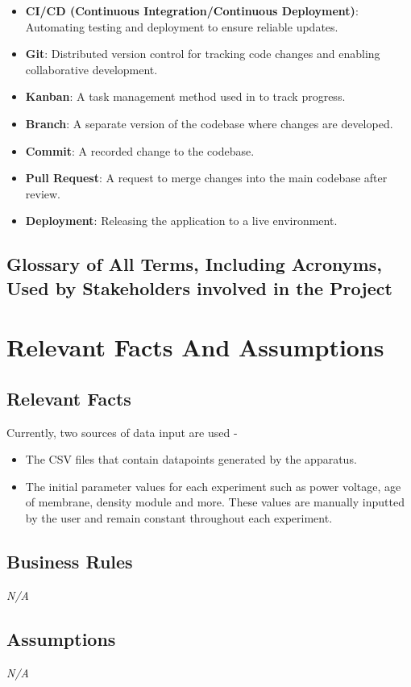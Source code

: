 \documentclass[12pt]{article}
\begin{document}
\begin{itemize}
    \item \textbf{CI/CD (Continuous Integration/Continuous Deployment)}:
    Automating testing and deployment to ensure reliable updates.
    \item \textbf{Git}: Distributed version control for tracking code changes
    and enabling collaborative development.
    \item \textbf{Kanban}: A task management method used in to track progress.
    \item \textbf{Branch}: A separate version of the codebase where changes are
    developed.
    \item \textbf{Commit}: A recorded change to the codebase.
    \item \textbf{Pull Request}: A request to merge changes into the main
    codebase after review.
    \item \textbf{Deployment}: Releasing the application to a live environment.
\end{itemize}

\subsection{Glossary of All Terms, Including Acronyms, Used by Stakeholders
involved in the Project}

\section{Relevant Facts And Assumptions}
\subsection{Relevant Facts}
Currently, two sources of data input are used -
\begin{itemize}
  \item The CSV files that contain datapoints generated by the apparatus.
  \item The initial parameter values for each experiment such as power voltage,
  age of membrane, density module and more. These values are manually inputted
  by the user and remain constant throughout each experiment.
\end{itemize}

\subsection{Business Rules}
\emph{N/A}
\subsection{Assumptions}
\emph{N/A}
\end{document}
